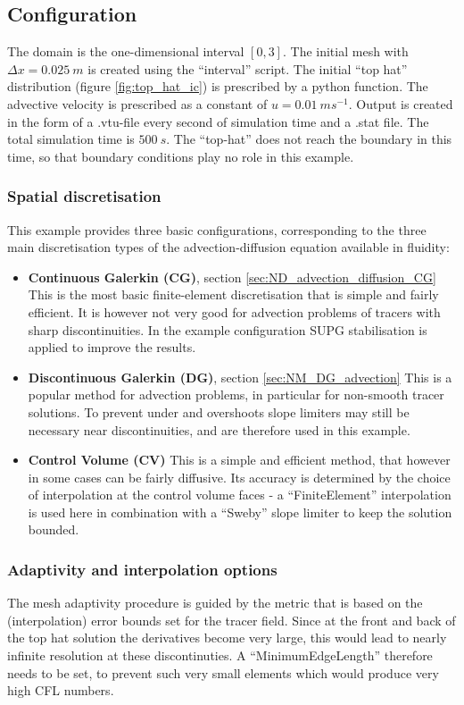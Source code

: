 \subsection{Configuration}
The domain is the one-dimensional interval $[0,3]$. The initial
mesh with $\Delta x=0.025~m$ is created using the ``interval''
script. The initial ``top hat'' distribution (figure \ref{fig:top_hat_ic}) is
prescribed by a python function. The advective velocity is
prescribed as a constant of $u=0.01~ms^{-1}$. Output is created
in the form of a .vtu-file every second of simulation time
and a .stat file. The total simulation time is $500~s$.
The ``top-hat'' does not reach the boundary in this time, so that
boundary conditions play no role in this example.

\subsubsection{Spatial discretisation}
This example provides three basic configurations, corresponding to
the three main discretisation types of the advection-diffusion equation
available in fluidity:
\begin{itemize}
\item {\bf Continuous Galerkin (CG)}, section \ref{sec:ND_advection_diffusion_CG}
This is the most basic finite-element discretisation that is simple
and fairly efficient. It is however not very good for advection problems
of tracers with sharp discontinuities. In the example configuration
SUPG stabilisation is applied to improve the results.
\item {\bf Discontinuous Galerkin (DG)}, section \ref{sec:NM_DG_advection}
This is a popular method for advection problems, in particular
for non-smooth tracer solutions. To prevent under and overshoots
slope limiters may still be necessary near discontinuities, and are
therefore used in this example.
\item {\bf Control Volume (CV)}
This is a simple and efficient method, that however in some cases
can be fairly diffusive. Its accuracy is determined by the choice
of interpolation at the control volume faces - a ``FiniteElement''
interpolation is used here in combination with a ``Sweby'' slope
limiter to keep the solution bounded.
\end{itemize}

\subsubsection{Adaptivity and interpolation options}
The mesh adaptivity procedure is guided by the metric that is based on
the (interpolation) error bounds set for the tracer field. Since at
the front and back of the top hat solution the derivatives
become very large, this would lead to nearly infinite resolution at these
discontinuties. A ``MinimumEdgeLength'' therefore needs to be set, to prevent
such very small elements which would produce very high CFL numbers.

